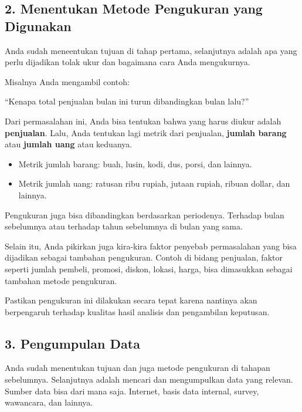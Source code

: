 \documentclass[openany]{book}
\providecommand{\tightlist}{%
  \setlength{\itemsep}{0pt}\setlength{\parskip}{0pt}}
\begin{document}
\subsection*{2. Menentukan Metode Pengukuran yang
Digunakan}\label{menentukan-metode-pengukuran-yang-digunakan}

Anda sudah meneentukan tujuan di tahap pertama, selanjutnya adalah apa
yang perlu dijadikan tolak ukur dan bagaimana cara Anda mengukurnya.

Misalnya Anda mengambil contoh:

``Kenapa total penjualan bulan ini turun dibandingkan bulan lalu?''

Dari permasalahan ini, Anda bisa tentukan bahwa yang harus diukur adalah
\textbf{penjualan}. Lalu, Anda tentukan lagi metrik dari penjualan,
\textbf{jumlah barang} atau \textbf{jumlah uang} atau keduanya.

\begin{itemize}
\tightlist
\item
  Metrik jumlah barang: buah, lusin, kodi, dus, porsi, dan lainnya.
\item
  Metrik jumlah uang: ratusan ribu rupiah, jutaan rupiah, ribuan dollar,
  dan lainnya.
\end{itemize}

Pengukuran juga bisa dibandingkan berdasarkan periodenya. Terhadap bulan
sebelumnya atau terhadap tahun sebelumnya di bulan yang sama.

Selain itu, Anda pikirkan juga kira-kira faktor penyebab permasalahan
yang bisa dijadikan sebagai tambahan pengukuran. Contoh di bidang
penjualan, faktor seperti jumlah pembeli, promosi, diskon, lokasi,
harga, bisa dimasukkan sebagai tambahan metode pengukuran.

Pastikan pengukuran ini dilakukan secara tepat karena nantinya akan
berpengaruh terhadap kualitas hasil analisis dan pengambilan keputusan.

\subsection*{3. Pengumpulan Data}\label{pengumpulan-data}

Anda sudah menentukan tujuan dan juga metode pengukuran di tahapan
sebelumnya. Selanjutnya adalah mencari dan mengumpulkan data yang
relevan. Sumber data bisa dari mana saja. Internet, basis data internal,
survey, wawancara, dan lainnya.
\end{document}
